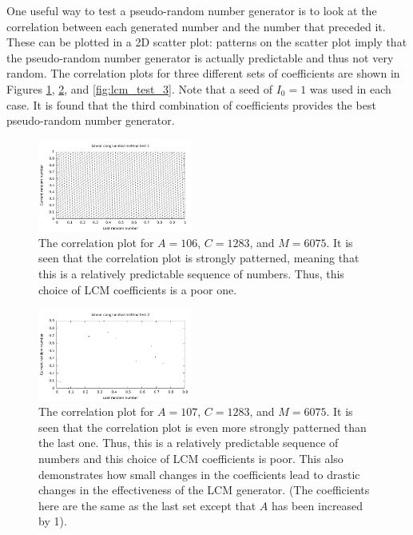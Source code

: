 \documentclass[twocolumn]{myarticle}
\begin{document}
One useful way to test a pseudo-random number generator is to look at the correlation between each generated number and the number that preceded it.
These can be plotted in a 2D scatter plot: patterns on the scatter plot imply that the pseudo-random number generator is actually predictable and thus not very random.
The correlation plots for three different sets of coefficients are shown in Figures \ref{fig:lcm_test_1}, \ref{fig:lcm_test_2}, and \ref{fig:lcm_test_3}.
Note that a seed of $ I_0 = 1 $ was used in each case.
It is found that the third combination of coefficients provides the best pseudo-random number generator.

\begin{figure}[ht!]
    \begin{center}
    \includegraphics[width = 0.45\textwidth]{../Plots/LCM_test_1.pdf}
    \caption{%
        The correlation plot for $ A = 106 $, $ C = 1283 $, and $ M = 6075 $.
        It is seen that the correlation plot is strongly patterned, meaning that this is a relatively predictable sequence of numbers.
        Thus, this choice of LCM coefficients is a poor one.
    }
    \label{fig:lcm_test_1}
    \end{center}
\end{figure}

\begin{figure}[ht!]
    \begin{center}
    \includegraphics[width = 0.45\textwidth]{../Plots/LCM_test_2.pdf}
    \caption{%
        The correlation plot for $ A = 107 $, $ C = 1283 $, and $ M = 6075 $.
        It is seen that the correlation plot is even more strongly patterned than the last one.
        Thus, this is a relatively predictable sequence of numbers and this choice of LCM coefficients is poor.
        This also demonstrates how small changes in the coefficients lead to drastic changes in the effectiveness of the LCM generator.
        (The coefficients here are the same as the last set except that $ A $ has been increased by 1).
    }
    \label{fig:lcm_test_2}
    \end{center}
\end{figure}
\end{document}
